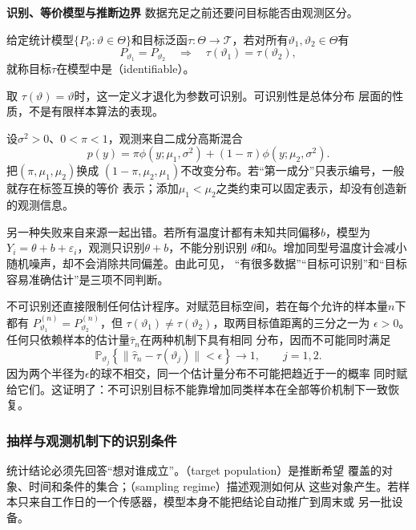 \par\medskip\noindent\textbf{识别、等价模型与推断边界}\quad
数据充足之前还要问目标能否由观测区分。
\begin{definition}[目标可识别性]
  \label{def:statistics-identifiability}
  给定统计模型\(\{P_\vartheta:\vartheta\in\Theta\}\)和目标泛函\(\tau:\Theta\to\mathcal T\)，若对所有\(\vartheta_1,\vartheta_2\in\Theta\)有
\[
  P_{\vartheta_1}=P_{\vartheta_2}
  \quad\Longrightarrow\quad
  \tau(\vartheta_1)=\tau(\vartheta_2),
\]
就称目标\(\tau\)在模型中是（identifiable）。
\end{definition}
取
\(\tau(\vartheta)=\vartheta\)时，这一定义才退化为参数可识别。可识别性是总体分布
层面的性质，不是有限样本算法的表现。

\begin{example}[混合成分的标签交换]
\label{ex:statistics-mixture-label-switching}
设\(\sigma^2>0\)、\(0<\pi<1\)，观测来自二成分高斯混合
\[
  p(y)=\pi\phi(y;\mu_1,\sigma^2)
       +(1-\pi)\phi(y;\mu_2,\sigma^2).
\]
把\((\pi,\mu_1,\mu_2)\)换成
\((1-\pi,\mu_2,\mu_1)\)不改变分布。若“第一成分”只表示编号，一般就存在标签互换的等价
表示；添加\(\mu_1<\mu_2\)之类约束可以固定表示，却没有创造新的观测信息。
\end{example}

另一种失败来自来源一起出错。若所有温度计都有未知共同偏移\(b\)，模型为
\(Y_i=\theta+b+\varepsilon_i\)，观测只识别\(\theta+b\)，不能分别识别
\(\theta\)和\(b\)。增加同型号温度计会减小随机噪声，却不会消除共同偏差。由此可见，
“有很多数据”“目标可识别”和“目标容易准确估计”是三项不同判断。

不可识别还直接限制任何估计程序。对赋范目标空间，若在每个允许的样本量\(n\)下都有
\(P_{\vartheta_1}^{(n)}=P_{\vartheta_2}^{(n)}\)，但
\(\tau(\vartheta_1)\neq\tau(\vartheta_2)\)，取两目标值距离的三分之一为
\(\epsilon>0\)。任何只依赖样本的估计量\(\widehat\tau_n\)在两种机制下具有相同
分布，因而不可能同时满足
\[
  \mathbb{P}_{\vartheta_j}
  \left\{\lVert\widehat\tau_n-\tau(\vartheta_j)\rVert<\epsilon\right\}
  \longrightarrow1,\qquad j=1,2.
\]
因为两个半径为\(\epsilon\)的球不相交，同一个估计量分布不可能把趋近于一的概率
同时赋给它们。这证明了：不可识别目标不能靠增加同类样本在全部等价机制下一致恢复。

\subsubsection{抽样与观测机制下的识别条件}
\label{sec:statistics-sampling-population}
\label{sec:statistics-missingness-observation}
统计结论必须先回答“想对谁成立”。（target population）是推断希望
覆盖的对象、时间和条件的集合；（sampling regime）描述观测如何从
这些对象产生。若样本只来自工作日的一个传感器，模型本身不能把结论自动推广到周末或
另一批设备。

